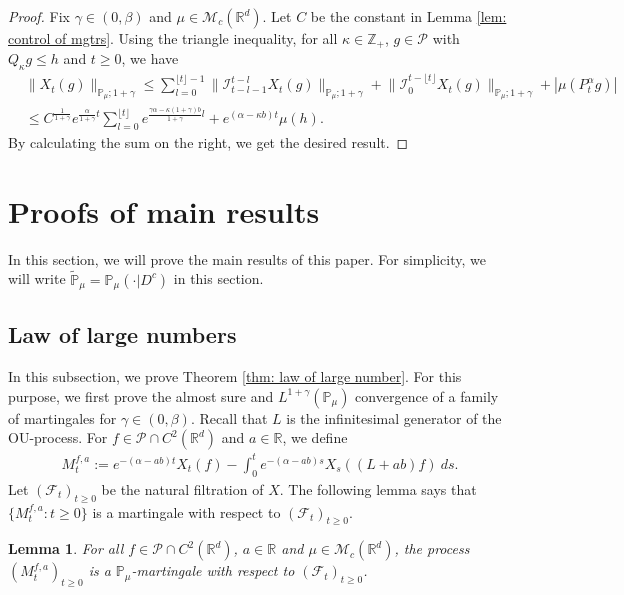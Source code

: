\documentclass[12pt,a4paper]{amsart}
\theoremstyle{plain}
\newtheorem{lem}[thm]{Lemma}
\theoremstyle{definition}
\numberwithin{equation}{section}
\begin{document}
\begin{proof}
  Fix $\gamma \in (0,\beta)$ and $\mu \in \mathcal M_c(\mathbb R^d)$.
  Let $C$ be the constant in Lemma \ref{lem: control of mgtrs}.
  Using the triangle inequality, for all $\kappa\in \mathbb Z_+$, $g \in \mathcal P$ with $Q_\kappa g \leq h$ and $t\geq 0$, we have
  \begin{align}
    & \|X_t(g)\|_{\mathbb P_\mu;1+\gamma}
      \leq \sum_{l=0}^{\lfloor t\rfloor - 1}\big\| \mathcal{I}_{t-l-1}^{t-l}X_t(g) \big\|_{\mathbb P_\mu;1+\gamma}+\big\| \mathcal{I}_{0}^{t-\lfloor t \rfloor}X_t(g)  \big\|_{\mathbb P_\mu;1+\gamma} + |\mu(P^\alpha_t g)| \\
    & \leq C^{\frac{1}{1+\gamma}} e^{\frac{\alpha}{1+\gamma}t} \sum_{l=0}^{\lfloor t\rfloor} e^{\frac{\gamma\alpha-\kappa (1+\gamma)b}{1+\gamma} l} + e^{(\alpha - \kappa b)t} \mu(h).
  \end{align}
  By calculating the sum on the right, we get the desired result.
\end{proof}

\section{Proofs of main results}
\label{proofs of main results}
In this section, we will prove the main results of this paper.
For simplicity, we will write $\mathbb{\widetilde{P}}_{\mu}=\mathbb{P}_{\mu}(\cdot|D^c)$ in this section.

\subsection{Law of large numbers}
\label{sec: large rate lln}

In this subsection, we prove Theorem \ref{thm: law of large number}.
For this purpose, we first prove the almost sure and $L^{1+\gamma}(\mathbb{P}_{\mu})$ convergence of a family of martingales for $\gamma\in (0, \beta)$. Recall that $L$ is the infinitesimal generator of the OU-process.  For $f\in \mathcal{P}\cap C^2(\mathbb R^d)$ and  $a\in \mathbb R$, we define
\begin{align}
  \label{defmartingale}
  M_t^{f,a}
   :=e^{-(\alpha-ab)t}X_t(f)-\int_0^t e^{-(\alpha-ab)s} X_s((L+ab)f)~ ds.
\end{align}
Let $(\mathscr{F}_t)_{t\geq 0}$ be the natural filtration of $X$.  The following lemma says that $\{M_t^{f,a}: t\geq 0\}$ is a martingale with respect to $(\mathscr{F}_t)_{t\geq 0}$.

\begin{lem}
  \label{lemma25}
  For all $f\in \mathcal{P}\cap C^2(\mathbb R^d)$, $a\in \mathbb R$ and $\mu\in \mathcal M_c(\mathbb R^d)$, the process $(M_t^{f,a})_{t\geq 0}$ is a $\mathbb P_\mu$-martingale with respect to $(\mathscr F_t)_{t\geq 0}$.
\end{lem}
\end{document}
